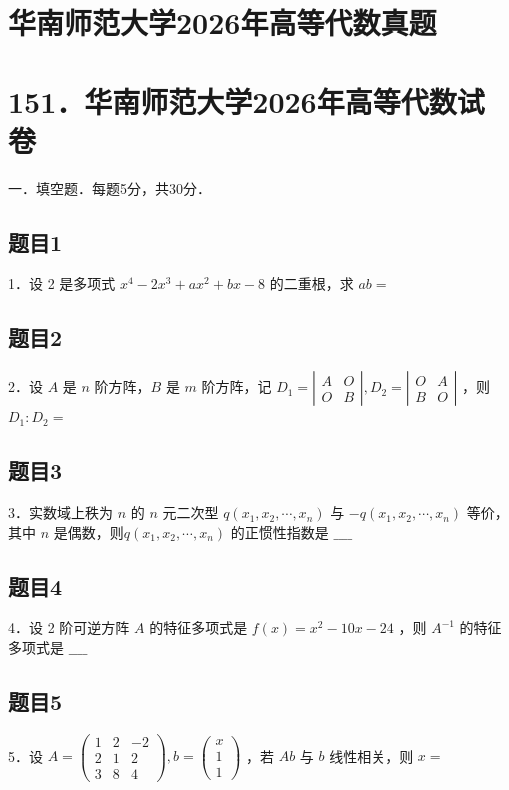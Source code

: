 \documentclass{article}
\begin{document}
\section*{华南师范大学2026年高等代数真题}
\section*{151．华南师范大学2026年高等代数试卷}
一．填空题．每题5分，共30分．\\

\subsection{题目1}
1．设 2 是多项式 \(x^{4}-2 x^{3}+a x^{2}+b x-8\) 的二重根，求 \(a b=\)

\subsection{题目2}
2．设 \(A\) 是 \(n\) 阶方阵，\(B\) 是 \(m\) 阶方阵，记 \(D_{1}=\left|\begin{array}{ll}A & O \\ O & B\end{array}\right|, D_{2}=\left|\begin{array}{ll}O & A \\ B & O\end{array}\right|\) ，则 \(D_{1}: D_{2}=\)

\subsection{题目3}
3．实数域上秩为 \(n\) 的 \(n\) 元二次型 \(q\left(x_{1}, x_{2}, \cdots, x_{n}\right)\) 与 \(-q\left(x_{1}, x_{2}, \cdots, x_{n}\right)\) 等价，其中 \(n\) 是偶数，则\(q\left(x_{1}, x_{2}, \cdots, x_{n}\right)\) 的正惯性指数是 \(\_\_\_\_\)

\subsection{题目4}
4．设 2 阶可逆方阵 \(A\) 的特征多项式是 \(f(x)=x^{2}-10 x-24\) ，则 \(A^{-1}\) 的特征多项式是 \(\_\_\_\_\)

\subsection{题目5}
5．设 \(A=\left(\begin{array}{ccc}1 & 2 & -2 \\ 2 & 1 & 2 \\ 3 & 8 & 4\end{array}\right), b=\left(\begin{array}{l}x \\ 1 \\ 1\end{array}\right)\) ，若 \(A b\) 与 \(b\) 线性相关，则 \(x=\)
\end{document}
